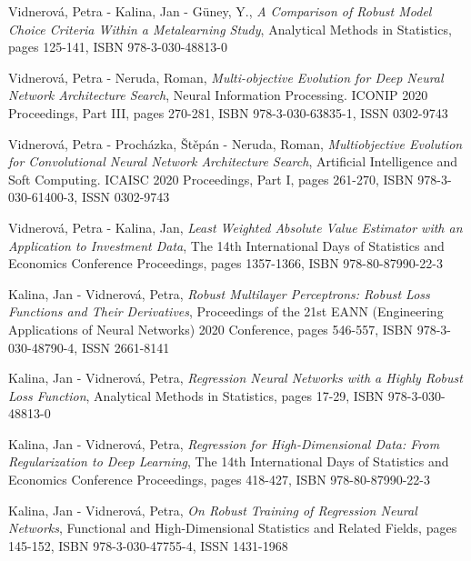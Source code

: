 \vspace{0.4em}
\noindent
Vidnerová, Petra - Kalina, Jan - Güney, Y., {\em A Comparison of Robust Model Choice Criteria Within a Metalearning Study}, Analytical Methods in Statistics, pages 125-141, ISBN 978-3-030-48813-0

\vspace{0.4em}
\noindent
Vidnerová, Petra - Neruda, Roman, {\em Multi-objective Evolution for Deep Neural Network Architecture Search}, Neural Information Processing. ICONIP 2020 Proceedings, Part III, pages 270-281, ISBN 978-3-030-63835-1, ISSN 0302-9743

\vspace{0.4em}
\noindent
Vidnerová, Petra - Procházka, Štěpán - Neruda, Roman, {\em Multiobjective Evolution for Convolutional Neural Network Architecture Search}, Artificial Intelligence and Soft Computing. ICAISC 2020 Proceedings, Part I, pages 261-270, ISBN 978-3-030-61400-3, ISSN 0302-9743

\vspace{0.4em}
\noindent
Vidnerová, Petra - Kalina, Jan, {\em Least Weighted Absolute Value Estimator with an Application to Investment Data}, The 14th International Days of Statistics and Economics Conference Proceedings, pages 1357-1366, ISBN 978-80-87990-22-3

\vspace{0.4em}
\noindent
Kalina, Jan - Vidnerová, Petra, {\em Robust Multilayer Perceptrons: Robust Loss Functions and Their Derivatives}, Proceedings of the 21st EANN (Engineering Applications of Neural Networks) 2020 Conference, pages 546-557, ISBN 978-3-030-48790-4, ISSN 2661-8141

\vspace{0.4em}
\noindent
Kalina, Jan - Vidnerová, Petra, {\em Regression Neural Networks with a Highly Robust Loss Function}, Analytical Methods in Statistics, pages 17-29, ISBN 978-3-030-48813-0

\vspace{0.4em}
\noindent
Kalina, Jan - Vidnerová, Petra, {\em Regression for High-Dimensional Data: From Regularization to Deep Learning}, The 14th International Days of Statistics and Economics Conference Proceedings, pages 418-427, ISBN 978-80-87990-22-3

\vspace{0.4em}
\noindent
Kalina, Jan - Vidnerová, Petra, {\em On Robust Training of Regression Neural Networks}, Functional and High-Dimensional Statistics and Related Fields, pages 145-152, ISBN 978-3-030-47755-4, ISSN 1431-1968

